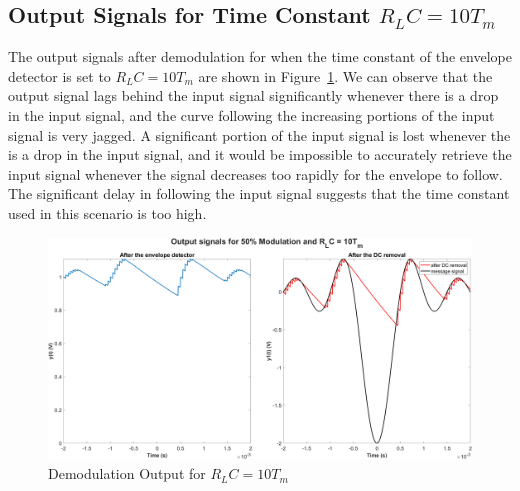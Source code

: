\documentclass[12pt]{article}
\begin{document}
\subsection*{Output Signals for Time Constant $R_LC = 10T_m$}
The output signals after demodulation for when the time constant of the envelope detector is set to $R_LC = 10T_m$ are shown in Figure~\ref{fig:q2ii}. We can observe that the output signal lags behind the input signal significantly whenever there is a drop in the input signal, and the curve following the increasing portions of the input signal is very jagged. A significant portion of the input signal is lost whenever the is a drop in the input signal, and it would be impossible to accurately retrieve the input signal whenever the signal decreases too rapidly for the envelope to follow. The significant delay in following the input signal suggests that the time constant used in this scenario is too high.
\begin{figure}[h!]
    \centering
    \includegraphics[width=\textwidth]{q2ii}
    \caption{\label{fig:q2ii}Demodulation Output for $R_LC = 10T_m$}
\end{figure}
\end{document}
